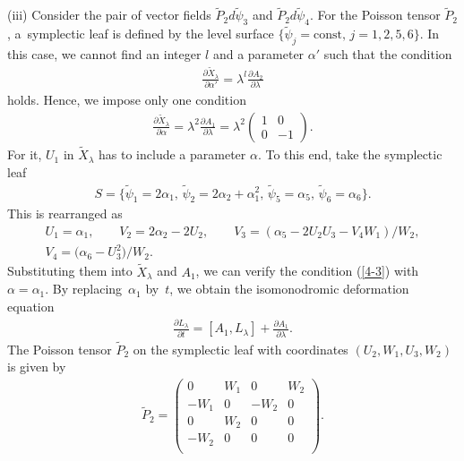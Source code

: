 \documentclass[pdftex]{sigma}
\numberwithin{equation}{section}
\begin{document}
(iii) Consider the pair of vector f\/ields $\widetilde{P}_2 d\widetilde{\psi}_3$ and $\widetilde{P}_2 d\widetilde{\psi}_4$. For the Poisson tensor $\widetilde{P}_2$, a~symplectic leaf is def\/ined by the level surface $\{ \widetilde{\psi}_j = \text{const},\, j=1,2,5,6\}$. In this case, we cannot f\/ind an integer $l$ and a parameter $\alpha '$ such that the condition
\begin{gather*}
\frac{\partial \widetilde{X}_\lambda }{\partial \alpha'} = \lambda^l \frac{\partial A_2 }{\partial \lambda }
\end{gather*}
holds. Hence, we impose only one condition
\begin{gather}
\frac{\partial \widetilde{X}_\lambda }{\partial \alpha} = \lambda^2 \frac{\partial A_1 }{\partial \lambda } = \lambda^2 \left(
\begin{matrix}
1 & 0 \\
0 & -1
\end{matrix}
\right).
\label{4-3}
\end{gather}
For it, $U_1$ in $\widetilde{X}_\lambda $ has to include a parameter $\alpha $. To this end, take the symplectic leaf
\begin{gather*}
S = \big\{ \widetilde{\psi}_1 = 2\alpha _1,\, \widetilde{\psi}_2 = 2\alpha _2+\alpha _1^2 ,\, \widetilde{\psi}_5 = \alpha _5,\, \widetilde{\psi}_6 = \alpha _6 \big\}.
\end{gather*}
This is rearranged as
\begin{gather*}
U_1 = \alpha _1,\qquad V_2 = 2\alpha _2 - 2U_2,\qquad V_3 = (\alpha _5 - 2U_2U_3 - V_4W_1)/W_2, \\
 V_4 = \big(\alpha _6 - U_3^2\big)/W_2.
\end{gather*}
Substituting them into $\widetilde{X}_\lambda$ and $A_1$, we can verify the condition (\ref{4-3}) with $\alpha = \alpha _1$. By repla\-cing~$\alpha _1$ by~$t$, we obtain the isomonodromic deformation equation
\begin{gather*}
\frac{\partial L_\lambda }{\partial t} = [A_1, L_\lambda ]+ \frac{\partial A_1}{\partial \lambda } .
\end{gather*}
The Poisson tensor $\widetilde{P}_2$ on the symplectic leaf with coordinates $(U_2, W_1 ,U_3, W_2)$ is given by
\begin{gather*}
\widetilde{P}_2 = \left(
\begin{matrix}
0 &W_1 &0 & W_2 \\
-W_1&0 &-W_2 &0 \\
0&W_2 &0 &0 \\
-W_2&0 &0 &0 \\
\end{matrix}
\right).
\end{gather*}
\end{document}
